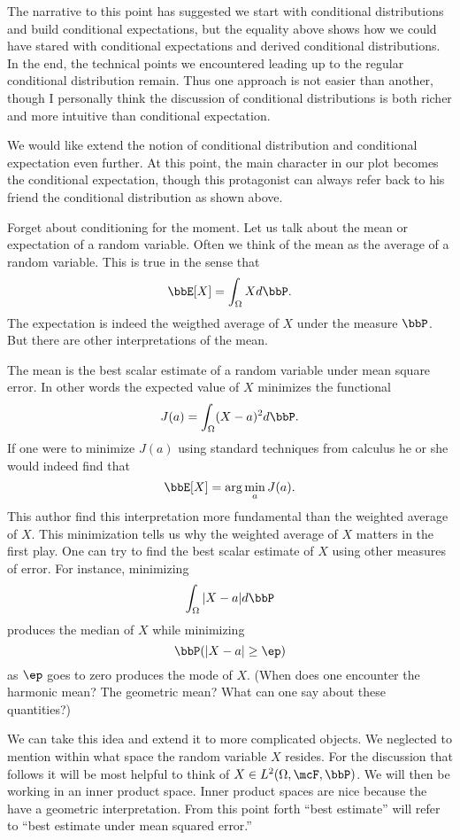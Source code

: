 \documentclass{report}
\begin{document}
The narrative to this point has suggested we start with conditional distributions and build conditional expectations, but the equality above shows how we could have stared with conditional expectations and derived conditional distributions.  In the end, the technical points we encountered leading up to the regular conditional distribution remain.  Thus one approach is not easier than another, though I personally think the discussion of conditional distributions is both richer and more intuitive than conditional expectation.

We would like extend the notion of conditional distribution and conditional expectation even further.  At this point, the main character in our plot becomes the conditional expectation, though this protagonist can always refer back to his friend the conditional distribution as shown above.

Forget about conditioning for the moment.  Let us talk about the mean or expectation of a random variable.  Often we think of the mean as the average of a random variable.  This is true in the sense that 
\[
\bbE[X] = \int_\Omega X d \bbP.
\]
The expectation is indeed the weigthed average of $X$ under the measure $\bbP$.  But there are other interpretations of the mean.  

The mean is the best scalar estimate of a random variable under mean square error.  In other words the expected value of $X$ minimizes the functional
\[
J(a) = \int_\Omega (X - a)^2 d \bbP.
\]
If one were to minimize $J(a)$ using standard techniques from calculus he or she would indeed find that
\[
\bbE[X] = \arg \min_a J(a).
\]
This author find this interpretation more fundamental than the weighted average of $X$.  This minimization tells us why the weighted average of $X$ matters in the first play.  One can try to find the best scalar estimate of $X$ using other measures of error.  For instance, minimizing
\[
\int_\Omega |X - a| d \bbP
\]
produces the median of $X$ while minimizing
\[
\bbP( |X - a| \geq \ep )
\]
as $\ep$ goes to zero produces the mode of $X$.  (When does one encounter the harmonic mean?  The geometric mean?  What can one say about these quantities?)

We can take this idea and extend it to more complicated objects.  We neglected to mention within what space the random variable $X$ resides.  For the discussion that follows it will be most helpful to think of $X \in L^2(\Omega, \mcF, \bbP)$.  We will then be working in an inner product space.  Inner product spaces are nice because the have a geometric interpretation.  From this point forth ``best estimate'' will refer to ``best estimate under mean squared error.''
\end{document}
